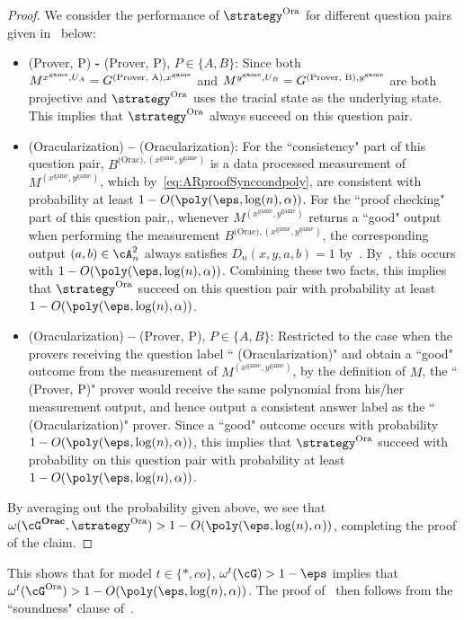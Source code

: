 \begin{proof}
	We consider the performance of $\strategy^{\text{Ora}}$ for different question pairs given in~ below:
	\begin{itemize}
		\item (Prover, P) \textbf{-}  (Prover, P), $P \in \{A,B\}$: Since both $M^{x^{\text{game}}, U_A} = G^{(\text{Prover, A}), x^{\text{game}}} $ and $M^{y^{\text{game}}, U_B} = G^{(\text{Prover, B}), y^{\text{game}}} $ are both projective and $\strategy^{\text{Ora}}$ uses the tracial state as the underlying state. This implies that $\strategy^{\text{Ora}}$ always succeed on this question pair.
		\item 	(Oracularization) \textbf{--} (Oracularization): For the ``consistency" part of this question pair,  $B^{\text{(Orac)}, (x^{\text{game}},y^{\text{game}})}$ is a data processed measurement of $M^{(x^{\text{game}}, y^{\text{game}})}$, which by~\eqref{eq:ARproofSynccondpoly}, are consistent with probability at least $1 - O(\poly(\eps, \log(n), \alpha))$. For the ``proof checking" part of this question pair,, whenever $M^{(x^{\text{game}}, y^{\text{game}})}$ returns a ``good" output when performing the measurement $B^{\text{(Orac)}, (x^{\text{game}},y^{\text{game}})}$, the corresponding output $(a,b) \in \cA_n^2$ always satisfies $D_n(x,y,a,b) = 1$ by~. By~, this occurs with $1 - O(\poly(\eps, \log(n), \alpha))$. Combining these two facts, this implies that $\strategy^{\text{Ora}}$ succeed on this question pair with probability at least $1 - O(\poly(\eps, \log(n), \alpha))$.  
		\item (Oracularization) \textbf{--} (Prover, P), $P \in \{A,B\}$: Restricted to the case when the provers receiving the question label `` (Oracularization)" and obtain a ``good" outcome from the measurement of $M^{(x^{\text{game}}, y^{\text{game}})}$, by the definition of $M$, the `` (Prover, P)" prover would receive the same polynomial from his/her measurement output, and hence output a consistent answer label as the `` (Oracularization)" prover. Since a ``good" outcome occurs with probability  $1 - O(\poly(\eps, \log(n), \alpha))$, this implies that $\strategy^{\text{Ora}}$ succeed with probability on this question pair with probability at least $1 - O(\poly(\eps, \log(n), \alpha))$.  
	\end{itemize}
	By averaging out the probability given above, we see that $\omega(\cG^{\textbf{Orac}}, \strategy^{\text{Ora}}) > 1 - O(\poly(\eps, \log(n), \alpha))$, completing the proof of the claim. 
\end{proof}
This shows that for model $t \in \{*,co\}$, $\omega^t(\cG) > 1- \eps$ implies that $\omega^t(\cG^{\text{Ora}}) > 1- O(\poly(\eps, \log(n), \alpha))$. The proof of~ then follows from the ``soundness" clause of~. 



